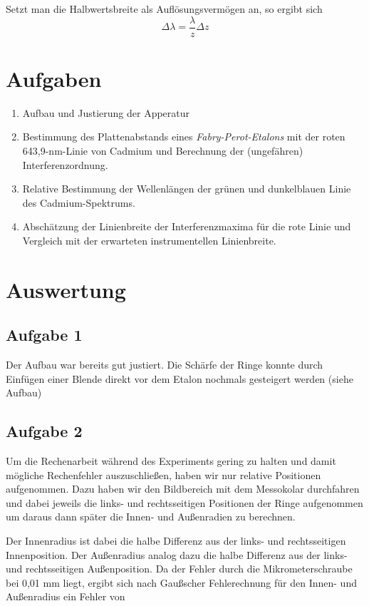 \documentclass[a4paper,german,12pt,smallheadings]{scrartcl}
\begin{document}
Setzt man die Halbwertsbreite als Auflösungsvermögen an, so ergibt sich
\begin{equation}
  \Delta \lambda = \frac{\lambda}{z} \Delta z
\end{equation}

\newpage
\section{Aufgaben}
\begin{enumerate}
  \item Aufbau und Justierung der Apperatur
  \item Bestimmung des Plattenabstands eines \textit{Fabry-Perot-Etalons} mit
    der roten 643{,}9-nm-Linie von Cadmium und Berechnung der (ungefähren)
    Interferenzordnung.
  \item Relative Bestimmung der Wellenlängen der grünen und dunkelblauen Linie
    des Cadmium-Spektrums.
  \item Abschätzung der Linienbreite der Interferenzmaxima für die rote Linie
    und Vergleich mit der erwarteten instrumentellen Linienbreite.
\end{enumerate}

\newpage
\section{Auswertung}
\subsection{Aufgabe 1}
Der Aufbau war bereits gut justiert. Die Schärfe der Ringe konnte durch
Einfügen einer Blende direkt vor dem Etalon nochmals gesteigert werden (siehe
Aufbau)

\subsection{Aufgabe 2}
Um die Rechenarbeit während des Experiments gering zu halten und damit mögliche
Rechenfehler auszuschließen, haben wir nur relative Positionen aufgenommen.
Dazu haben wir den Bildbereich mit dem Messokolar durchfahren und dabei jeweils
die links- und rechtsseitigen Positionen der Ringe aufgenommen um daraus dann
später die Innen- und Außenradien zu berechnen.

Der Innenradius ist dabei die halbe Differenz aus der links- und rechtsseitigen
Innenposition. Der Außenradius analog dazu die halbe Differenz aus der links-
und rechtsseitigen Außenposition. Da der Fehler durch die Mikrometerschraube
bei 0{,}01 mm liegt, ergibt sich nach Gaußscher Fehlerechnung für den Innen-
und Außenradius ein Fehler von
\end{document}
